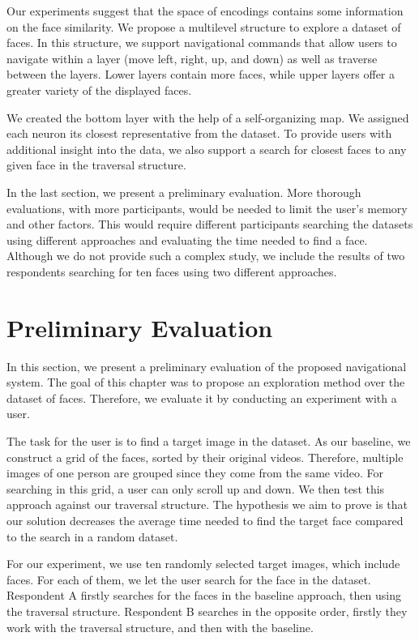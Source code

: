 Our experiments suggest that the space of encodings contains some information on the face similarity. We propose a multilevel structure to explore a dataset of faces. In this structure, we support navigational commands that allow users to navigate within a layer (move left, right, up, and down) as well as traverse between the layers. Lower layers contain more faces, while upper layers offer a greater variety of the displayed faces.

We created the bottom layer with the help of a self-organizing map. We assigned each neuron its closest representative from the dataset. To provide users with additional insight into the data, we also support a search for closest faces to any given face in the traversal structure.

In the last section, we present a preliminary evaluation. More thorough evaluations, with more participants, would be needed to limit the user's memory and other factors. This would require different participants searching the datasets using different approaches and evaluating the time needed to find a face. Although we do not provide such a complex study, we include the results of two respondents searching for ten faces using two different approaches.

\section{Preliminary Evaluation}

In this section, we present a preliminary evaluation of the proposed navigational system. The goal of this chapter was to propose an exploration method over the dataset of faces. Therefore, we evaluate it by conducting an experiment with a user.

The task for the user is to find a target image in the dataset. As our baseline, we construct a grid of the faces, sorted by their original videos. Therefore, multiple images of one person are grouped since they come from the same video. For searching in this grid, a user can only scroll up and down. We then test this approach against our traversal structure. The hypothesis we aim to prove is that our solution decreases the average time needed to find the target face compared to the search in a random dataset.

For our experiment, we use ten randomly selected target images, which include faces. For each of them, we let the user search for the face in the dataset. Respondent A firstly searches for the faces in the baseline approach, then using the traversal structure. Respondent B searches in the opposite order, firstly they work with the traversal structure, and then with the baseline.

